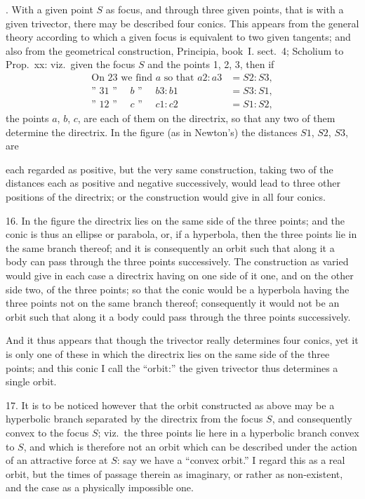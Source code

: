 \documentclass[11pt,a4paper]{article}
\theoremstyle{definition}
\begin{document}
. With a given point $S$ as focus, and through three given points, that is with a given
trivector, there may be described four conics. This appears from the general theory
according to which a given focus is equivalent to two given tangents; and also from the
geometrical construction, Principia, book~I. sect.~4; Scholium to Prop.~xx:
viz.~given the focus $S$ and the points 1, 2, 3, then if
\begin{align*}
\text{On } 23 \text{ we find } a \text{ so that } a2 : a3 &= S2 : S3, \\
\text{'' } 31 \text{ '' } \quad b \text{ '' } \quad b3 : b1 &= S3 : S1, \\
\text{'' } 12 \text{ '' } \quad c \text{ '' } \quad c1 : c2 &= S1 : S2,
\end{align*}
the points $a$, $b$, $c$, are each of them on the directrix, so that any two of them determine
the directrix. In the figure (as in Newton's) the distances $S1$, $S2$, $S3$, are

\newpage
\noindent
each regarded as positive, but the very same construction, taking two of the distances
each as positive and negative successively, would lead to three other positions of the
directrix; or the construction would give in all four conics.

16. In the figure the directrix lies on the same side of the three points; and the conic
is thus an ellipse or parabola, or, if a hyperbola, then the three points lie in the same
branch thereof; and it is consequently an orbit such that along it a body can pass through
the three points successively. The construction as varied would give in each case a
directrix having on one side of it one, and on the other side two, of the three points;
so that the conic would be a hyperbola having the three points not on the same branch
thereof; consequently it would not be an orbit such that along it a body could pass
through the three points successively.

And it thus appears that though the trivector really determines four conics, yet it is
only one of these in which the directrix lies on the same side of the three points; and this
conic I call the ``orbit:'' the given trivector thus determines a single orbit.

17. It is to be noticed however that the orbit constructed as above may be a hyperbolic
branch separated by the directrix from the focus $S$, and consequently convex to the focus
$S$; viz.~the three points lie here in a hyperbolic branch convex to $S$, and which is
therefore not an orbit which can be described under the action of an attractive force at
$S$: say we have a ``convex orbit.'' I regard this as a real orbit, but the times of passage
therein as imaginary, or rather as non-existent, and the case as a physically impossible one.
\end{document}
